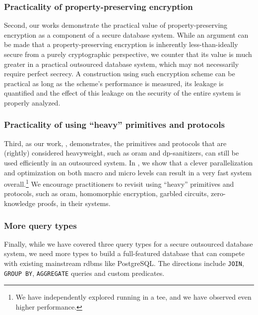 	\subsubsection{Practicality of property-preserving encryption}

		Second, our works \cite{ore-benchmark-17,k-anon} demonstrate the practical value of property-preserving encryption as a component of a secure database system.
		While an argument can be made that a property-preserving encryption is inherently less-than-ideally secure from a purely cryptographic perspective, we counter that its value is much greater in a practical outsourced database system, which may not necessarily require perfect secrecy.
		A construction using such encryption scheme can be practical as long as the scheme's performance is measured, its leakage is quantified and the effect of this leakage on the security of the entire system is properly analyzed.

	\subsubsection{Practicality of using ``heavy'' primitives and protocols}

		Third, as our work, \epsolute{}, demonstrates, the primitives and protocols that are (rightly) considered heavyweight, such as \acrshort{oram} and \acrshort{dp}-sanitizers, can still be used efficiently in an outsourced system.
		In \epsolute{}, we show that a clever parallelization and optimization on both macro and micro levels can result in a very fast system overall.\footnote{
			We have independently explored running \epsolute{} in a \acrlong{tee}, and we have observed even higher performance.
		}
		We encourage practitioners to revisit using ``heavy'' primitives and protocols, such as \acrshort{oram}, homomorphic encryption, garbled circuits, zero-knowledge proofs, in their systems.

	\subsubsection{More query types}

		Finally, while we have covered three query types for a secure outsourced database system, we need more types to build a full-featured database that can compete with existing mainstream \acrshort{rdbms} like PostgreSQL\@.
		The directions include \texttt{JOIN}, \texttt{GROUP BY}, \texttt{AGGREGATE} queries and custom predicates.
